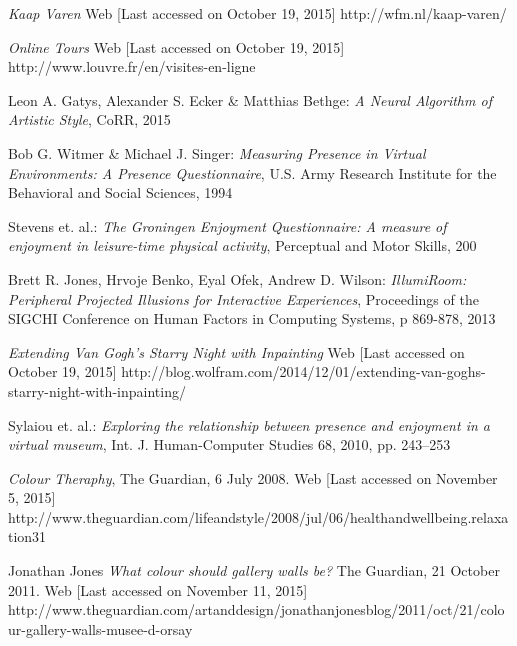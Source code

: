 \documentclass[a4paper]{article}
\begin{document}
\begin{thebibliography}{99}
\emph{Kaap Varen}
Web [Last accessed on October 19, 2015]
http://wfm.nl/kaap-varen/

\emph{Online Tours}
Web [Last accessed on October 19, 2015]
http://www.louvre.fr/en/visites-en-ligne

 Leon A. Gatys, Alexander S. Ecker \& Matthias Bethge:
\emph{A Neural Algorithm of Artistic Style},
CoRR, 2015

 Bob G. Witmer \& Michael J. Singer:
\emph{Measuring Presence in Virtual Environments: A Presence Questionnaire},
U.S. Army Research Institute for the Behavioral and Social Sciences, 1994

 Stevens et. al.:
\emph{The Groningen Enjoyment Questionnaire: A measure of enjoyment in leisure-time physical activity},
Perceptual and Motor Skills, 200

 Brett R. Jones, Hrvoje Benko, Eyal Ofek, Andrew D. Wilson:
\emph{IllumiRoom: Peripheral Projected Illusions for
Interactive Experiences},
Proceedings of the SIGCHI Conference on Human Factors in Computing Systems, p 869-878, 2013

\emph{Extending Van Gogh’s \emph{Starry Night} with Inpainting}
Web [Last accessed on October 19, 2015]
http://blog.wolfram.com/2014/12/01/extending-van-goghs-starry-night-with-inpainting/

 Sylaiou et. al.:
\emph{Exploring the relationship between presence and enjoyment in a virtual museum},
Int. J. Human-Computer Studies 68, 2010, pp. 243--253

\emph{Colour Theraphy}, 
The Guardian, 6 July 2008.
Web [Last accessed on November 5, 2015]
http://www.theguardian.com/lifeandstyle/2008/jul/06/healthandwellbeing.relaxation31

 Jonathan Jones
\emph{What colour should gallery walls be?}
The Guardian, 21 October 2011.
Web [Last accessed on November 11, 2015]
http://www.theguardian.com/artanddesign/jonathanjonesblog/2011/oct/21/colour-gallery-walls-musee-d-orsay


\end{thebibliography}
\end{document}
